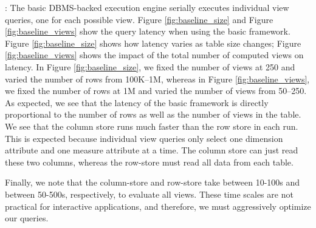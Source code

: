 
: The basic DBMS-backed execution engine
serially executes individual view queries, one for each possible view.
Figure \ref{fig:baseline_size} and Figure \ref{fig:baseline_views} show the query
 latency when using the basic framework.
Figure \ref{fig:baseline_size} shows how latency varies as table size changes;
 Figure \ref{fig:baseline_views} shows the impact of the total number of computed
views on latency.
In Figure \ref{fig:baseline_size}, we fixed the number of views at 250 and
varied the number of rows from 100K--1M, whereas in Figure
\ref{fig:baseline_views}, we fixed the number of rows at 1M and varied the
number of views from 50--250.
As expected, we see that the latency of the basic framework is directly
proportional to the number of rows as well as the number of views in the table.
We see that the column store runs much faster than the row store in each run.
This is expected because individual view queries only select one dimension
attribute and one measure attribute at a time.  The column store can just read these two
columns, whereas the row-store must read all data from each table.

Finally, we note that the column-store and row-store take between 10-100s
and between 50-500s, respectively, to evaluate all views.
These time scales are not practical for interactive applications, and
therefore, we must aggressively optimize our queries. \\


